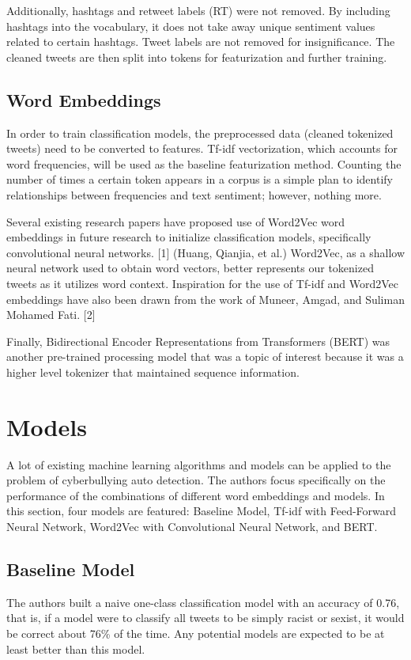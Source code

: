 \documentclass[conference]{IEEEtran}
\begin{document}
Additionally, hashtags and retweet labels (RT) were not removed. By including hashtags into the vocabulary, it does not take away unique sentiment values related to certain hashtags. Tweet labels are not removed for insignificance. The cleaned tweets are then split into tokens for featurization and further training.


\subsection{Word Embeddings}

In order to train classification models, the preprocessed data (cleaned tokenized tweets) need to be converted to features. Tf-idf vectorization, which accounts for word frequencies, will be used as the baseline featurization method. Counting the number of times a certain token appears in a corpus is a simple plan to identify relationships between frequencies and text sentiment; however, nothing more.

	Several existing research papers have proposed use of Word2Vec word embeddings in future research to initialize classification models, specifically convolutional neural networks. [1] (Huang, Qianjia, et al.) Word2Vec, as a shallow neural network used to obtain word vectors, better represents our tokenized tweets as it utilizes word context. Inspiration for the use of Tf-idf and Word2Vec embeddings have also been drawn from the work of Muneer, Amgad, and Suliman Mohamed Fati.  [2]

	Finally, Bidirectional Encoder Representations from Transformers (BERT) was another pre-trained processing model that was a topic of interest because it was a higher level tokenizer that maintained sequence information.



\section{Models}
A lot of existing machine learning algorithms and models can be applied to the problem of cyberbullying auto detection. The authors focus specifically on the performance of the combinations of different word embeddings and models. In this section, four models are featured: Baseline Model, Tf-idf with Feed-Forward Neural Network, Word2Vec with Convolutional Neural Network, and BERT.

\subsection{Baseline Model}
The authors built a naive one-class classification model with an accuracy of 0.76, that is, if a model were to classify all tweets to be simply racist or sexist, it would be correct about 76\% of the time. Any potential models are expected to be at least better than this model.
\end{document}
